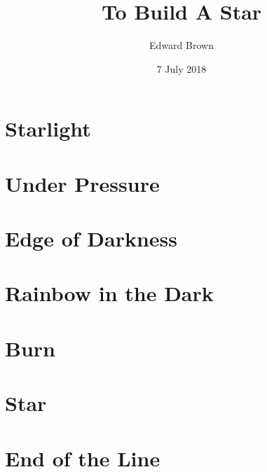 \documentclass[profonts,stix,symmetric]{astro-bookshelf}
\title{To Build A Star}
\author{Edward Brown}
\date{7 July 2018}
\begin{document}
\frontmatter
{}


\mainmatter
{}
\setcounter{page}{1}

\chapter{Starlight}\label{ch.starlight}


\chapter{Under Pressure}\label{ch.basic-stellar-properties}


\chapter{Edge of Darkness}\label{ch.radiative-transport}


\chapter{Rainbow in the Dark}\label{ch.classifying-stars}


\chapter{Burn}\label{ch.nuclear-burning}


\chapter{Star}\label{ch.main-sequence}


\chapter{End of the Line}\label{ch.post-main-sequence}



\backmatter


\end{document}
